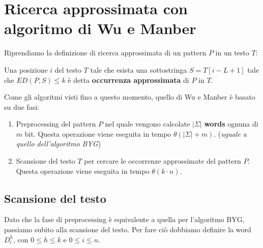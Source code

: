 \section{Ricerca approssimata con algoritmo di Wu e Manber}
Riprendiamo la definizione di ricerca approssimata di un pattern $P$ in un testo $T$:
\begin{definizione}
    Una posizione $i$ del testo $T$ tale che esista una sottostringa $S =T[i - L + 1]$
    tale che $ED(P, S) \leq k$ è detta \textbf{occurrenza approssimata} di $P$ in $T$.
\end{definizione}

Come gli algoritmi visti fino a questo momento, quello di Wu e Manber è basato su due fasi:
\begin{enumerate}
    \item Preprocessing del pattern $P$ nel quale vengono calcolate $|\Sigma|$
          \textbf{words} ognuna di $m$ bit. Questa operazione viene eseguita in tempo
          $\theta(|\Sigma| + m)$. (\textit{uguale a quello dell'algoritmo BYG})
    \item Scansione del testo $T$ per cercare le occorrenze approssimate del pattern $P$.
          Questa operazione viene eseguita in tempo $\theta(k \cdot n)$.
\end{enumerate}
\subsection{Scansione del testo}
Dato che la fase di preprocessing è equivalente a quella per l'algoritmo BYG,
passiamo subito alla scansione del testo. Per fare ciò dobbiamo definire la word
$D_i^h$, con $0 \leq h \leq k$ e $0 \leq i \leq n$.

